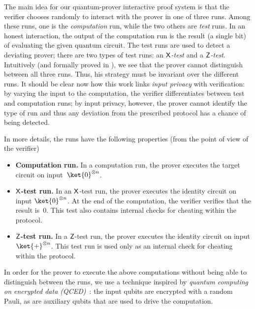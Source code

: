 \documentclass{toc}
\newcommand{\xgate}{{\sf X}}
\newcommand{\zgate}{{\sf Z}}
\begin{document}
The main idea for our quantum-prover interactive proof system is that the verifier chooses randomly to interact with the prover in one of three runs.
Among these runs, one is the \emph{computation} run, while the two others are \emph{test} runs. In an honest interaction, the output of the computation run is the result (a single bit) of evaluating the given quantum circuit. The test runs are used to detect a deviating prover; there are two types of test runs: an \emph{$\xgate$-test} and a \emph{$\zgate$-test}.
Intuitively (and formally proved in ), we  see that the prover cannot distinguish between all three runs.  Thus, his  strategy must be invariant over the different runs. %
It should be clear now how this work links \emph{input privacy} with verification:  by varying the input to the computation, the verifier differentiates between test and computation runs; by input privacy, however, the prover cannot identify the type of run and thus any deviation from the prescribed protocol has a chance of being detected.

In more details, the runs have the following properties (from the point of view of the verifier)
\begin{itemize}
\item \textbf{Computation run.} In a computation run, the prover executes the target circuit on input~$\ket{0}^{\otimes n}$.
\item \textbf{$\xgate$-test run.} In an $\xgate$-test run, the prover executes the identity circuit on input $\ket{0}^{\otimes n}$. At the end of the computation, the verifier verifies that the result is~$0$.  This test also contains internal checks for cheating within the protocol.
\item \textbf{$\zgate$-test run.}  In a $\zgate$-test run, the prover executes the identity circuit on input $\ket{+}^{\otimes n}$.  This test run is used only as an internal check for cheating within the protocol.
\end{itemize}

In order for the prover to execute the above computations without being able to distinguish between the runs, we use a technique inspired by \emph{quantum computing on encrypted data (QCED)}~\cite{FBS+14,Bro15}: the input qubits are encrypted with a random Pauli, as are auxiliary qubits that are used to drive the computation.
\end{document}
